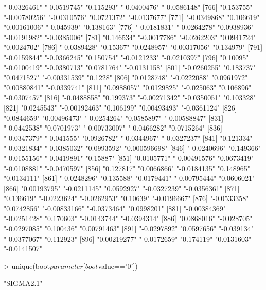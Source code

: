 \begin{Schunk}
\begin{Soutput}
[761] "-0.0326461"   "-0.0519745"   "0.115293"     "-0.0400476"   "-0.0586148"  
[766] "0.153755"     "-0.00780256"  "-0.0310576"   "0.0721372"    "-0.0137677"  
[771] "-0.0349868"   "0.106619"     "0.00161006"   "-0.045939"    "0.138163"    
[776] "-0.0181831"   "-0.0264278"   "0.0938936"    "-0.0191982"   "-0.0385006"  
[781] "0.146534"     "-0.0017786"   "-0.0262203"   "0.0941724"    "0.0024702"   
[786] "-0.0389428"   "0.15367"      "0.0248957"    "0.00317056"   "0.134979"    
[791] "-0.0159844"   "-0.0366245"   "0.150754"     "-0.0121233"   "-0.0210397"  
[796] "0.10095"      "-0.0100419"   "-0.0380713"   "0.0781764"    "-0.0131158"  
[801] "-0.0260255"   "0.183737"     "0.0471527"    "-0.00331539"  "0.1228"      
[806] "0.0128748"    "-0.0222088"   "0.0961972"    "0.00880841"   "-0.0339741"  
[811] "0.0988057"    "0.0129825"    "-0.025063"    "0.106896"     "-0.0307457"  
[816] "-0.0488858"   "0.199373"     "-0.00271342"  "-0.0350051"   "0.103328"    
[821] "0.0245543"    "-0.00192463"  "0.106199"     "0.00493493"   "-0.0361124"  
[826] "0.0844659"    "0.00496473"   "-0.0254264"   "0.0585897"    "-0.00588847" 
[831] "-0.0442538"   "0.0701973"    "-0.00733007"  "-0.0466282"   "0.0715264"   
[836] "-0.0347379"   "-0.041555"    "0.0926782"    "-0.0344967"   "-0.0327237"  
[841] "0.121334"     "-0.0321834"   "-0.0385032"   "0.0993592"    "0.000596698" 
[846] "-0.0240696"   "0.149366"     "-0.0155156"   "-0.0419891"   "0.15887"     
[851] "0.0105771"    "-0.00491576"  "0.0673419"    "-0.0108881"   "-0.0470597"  
[856] "0.127817"     "0.0066866"    "-0.0184135"   "0.148965"     "0.0134111"   
[861] "-0.0248296"   "0.135588"     "0.0179441"    "-0.00795444"  "0.0606021"   
[866] "0.00193795"   "-0.0211145"   "0.0592927"    "-0.0327239"   "-0.0356361"  
[871] "0.136619"     "-0.0223624"   "-0.0262953"   "0.10639"      "-0.0196667"  
[876] "-0.0533358"   "0.0742856"    "-0.00833166"  "-0.0373464"   "0.0998201"   
[881] "-0.00384369"  "-0.0251428"   "0.170603"     "-0.0143744"   "-0.0394314"  
[886] "0.0868016"    "-0.028705"    "-0.0297085"   "0.100436"     "0.00791463"  
[891] "-0.0297892"   "0.0597656"    "-0.039134"    "-0.0377067"   "0.112923"    
[896] "0.00219277"   "-0.0172659"   "0.174119"     "0.0131603"    "-0.0141507"  
\end{Soutput}
\begin{Sinput}
> unique(boot$parameter[boot$value=='0'])
\end{Sinput}
\begin{Soutput}
[1] "SIGMA2.1"
\end{Soutput}
\end{Schunk}
